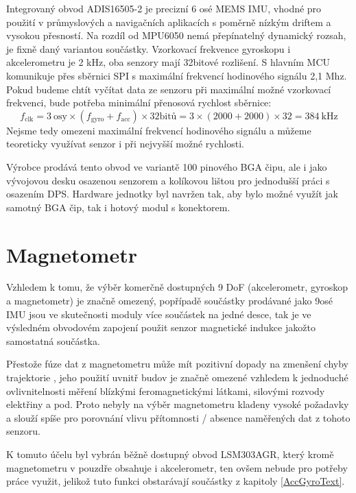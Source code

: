 Integrovaný obvod ADIS16505-2 je precizní 6 osé MEMS IMU, vhodné pro použití v průmyslových a navigačních aplikacích s poměrně nízkým driftem a vysokou přesností. Na rozdíl od MPU6050 nemá přepínatelný dynamický rozsah, je fixně daný variantou součástky. Vzorkovací frekvence gyroskopu i akcelerometru je 2 kHz, oba senzory mají 32bitové rozlišení. S hlavním MCU komunikuje přes sběrnici SPI s maximální frekvencí hodinového signálu 2,1 Mhz. \cite{UZFqHmQU7ZzI3OLB} Pokud budeme chtít vyčítat data ze senzoru při maximální možné vzorkovací frekvenci, bude potřeba minimální přenosová rychlost sběrnice: 
\begin{equation}
f_{\mathrm{clk}}=3~\mathrm{osy} \times(f_{\mathrm{gyro}} + f_{\mathrm{acc}})\times \mathrm{32bitů}=3\times(2000+2000)\times 32=\SI{384}{\kilo\hertz}
\end{equation}
Nejsme tedy omezeni maximální frekvencí hodinového signálu a můžeme teoreticky využívat senzor i při nejvyšší možné rychlosti.

Výrobce prodává tento obvod ve variantě 100 pinového BGA čipu, ale i jako vývojovou desku osazenou senzorem a kolíkovou lištou pro jednodušší práci s osazením DPS. \cite{UZFqHmQU7ZzI3OLB} Hardware jednotky byl navržen tak, aby bylo možné využít jak samotný BGA čip, tak i hotový modul s konektorem.

\section{Magnetometr}
Vzhledem k tomu, že výběr komerčně dostupných 9 DoF (akcelerometr, gyroskop a magnetometr) je značně omezený, popřípadě součástky prodávané jako 9osé IMU jsou ve skutečnosti moduly více součástek na jedné desce, tak je ve výsledném obvodovém zapojení použit senzor magnetické indukce jakožto samostatná součástka. 

Přestože fúze dat z magnetometru může mít pozitivní dopady na zmenšení chyby trajektorie \cite{Tkhorenko2018}, jeho použití uvnitř budov je značně omezené vzhledem k jednoduché ovlivnitelnosti měření blízkými feromagnetickými látkami, silovými rozvody elektřiny a pod. Proto nebyly na výběr magnetometru kladeny vysoké požadavky a slouží spíše pro porovnání vlivu přítomnosti / absence naměřených dat z tohoto senzoru.

K tomuto účelu byl vybrán běžně dostupný obvod LSM303AGR, který kromě magnetometru v pouzdře obsahuje i akcelerometr, ten ovšem nebude pro potřeby práce využit, jelikož tuto funkci obstarávají součástky z kapitoly \ref{AccGyroText}.

